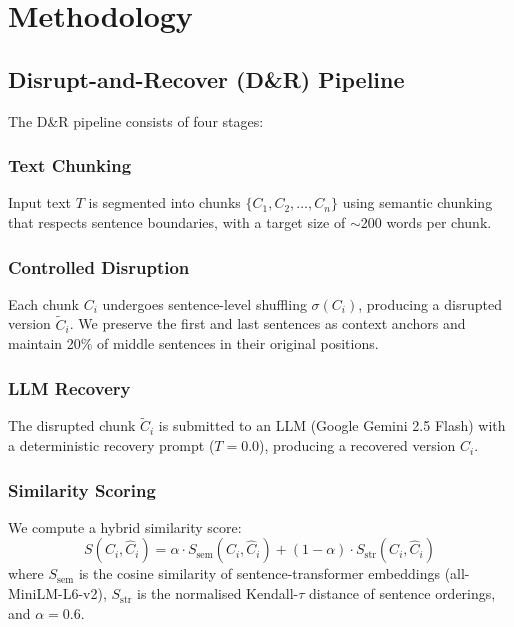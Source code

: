 \documentclass[conference]{IEEEtran}
\begin{document}
\section{Methodology}

\subsection{Disrupt-and-Recover (D\&R) Pipeline}

The D\&R pipeline consists of four stages:

\subsubsection{Text Chunking}
Input text $T$ is segmented into chunks $\{C_1, C_2, \ldots, C_n\}$
using semantic chunking that respects sentence boundaries, with a
target size of $\sim$200 words per chunk.

\subsubsection{Controlled Disruption}
Each chunk $C_i$ undergoes sentence-level shuffling $\sigma(C_i)$,
producing a disrupted version $\tilde{C}_i$. We preserve the first and
last sentences as context anchors and maintain 20\% of middle sentences
in their original positions.

\subsubsection{LLM Recovery}
The disrupted chunk $\tilde{C}_i$ is submitted to an LLM (Google Gemini
2.5 Flash) with a deterministic recovery prompt ($T=0.0$), producing
a recovered version $\hat{C}_i$.

\subsubsection{Similarity Scoring}
We compute a hybrid similarity score:
\begin{equation}
    S(C_i, \hat{C}_i) = \alpha \cdot S_{\text{sem}}(C_i, \hat{C}_i)
    + (1 - \alpha) \cdot S_{\text{str}}(C_i, \hat{C}_i)
\end{equation}
where $S_{\text{sem}}$ is the cosine similarity of sentence-transformer
embeddings (all-MiniLM-L6-v2), $S_{\text{str}}$ is the normalised
Kendall-$\tau$ distance of sentence orderings, and $\alpha = 0.6$.
\end{document}
